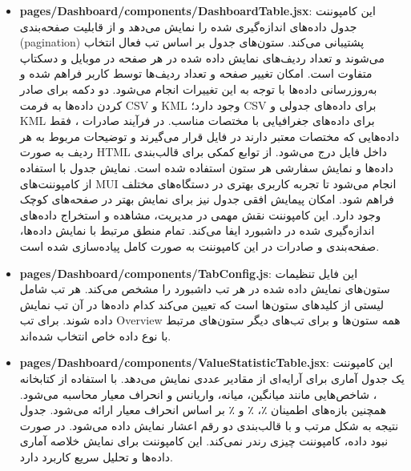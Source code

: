 \begin{itemize}
    	\item \textbf{pages/Dashboard/components/DashboardTable.jsx}:
    	این کامپوننت جدول داده‌های اندازه‌گیری شده را نمایش می‌دهد و از قابلیت صفحه‌بندی (pagination) پشتیبانی می‌کند.
    	ستون‌های جدول بر اساس تب فعال انتخاب می‌شوند و تعداد ردیف‌های نمایش داده شده در هر صفحه در موبایل و دسکتاپ متفاوت است.
    	امکان تغییر صفحه و تعداد ردیف‌ها توسط کاربر فراهم شده و به‌روزرسانی داده‌ها با توجه به این تغییرات انجام می‌شود.
    	دو دکمه برای صادر کردن داده‌ها به فرمت CSV و KML وجود دارد؛ CSV برای داده‌های جدولی و KML برای داده‌های جغرافیایی با مختصات مناسب.
    	در فرآیند صادرات ، فقط داده‌هایی که مختصات معتبر دارند در فایل قرار می‌گیرند و توضیحات مربوط به هر ردیف به صورت HTML داخل فایل درج می‌شود.
    	از توابع کمکی برای قالب‌بندی داده‌ها و نمایش سفارشی هر ستون استفاده شده است.
    	نمایش جدول با استفاده از کامپوننت‌های MUI انجام می‌شود تا تجربه کاربری بهتری در دستگاه‌های مختلف فراهم شود.
    	امکان پیمایش افقی جدول نیز برای نمایش بهتر در صفحه‌های کوچک وجود دارد.
    	این کامپوننت نقش مهمی در مدیریت، مشاهده و استخراج داده‌های اندازه‌گیری شده در داشبورد ایفا می‌کند.
    	تمام منطق مرتبط با نمایش داده‌ها، صفحه‌بندی و صادرات در این کامپوننت به صورت کامل پیاده‌سازی شده است.
    	
    	
    	\item \textbf{pages/Dashboard/components/TabConfig.js}:
    	این فایل تنظیمات ستون‌های نمایش داده شده در هر تب داشبورد را مشخص می‌کند.
    	هر تب شامل لیستی از کلیدهای ستون‌ها است که تعیین می‌کند کدام داده‌ها در آن تب نمایش داده شوند.
    	برای تب Overview همه ستون‌ها و برای تب‌های دیگر ستون‌های مرتبط با نوع داده خاص انتخاب شده‌اند.
    	
    	
    	\item \textbf{pages/Dashboard/components/ValueStatisticTable.jsx}:
    	این کامپوننت یک جدول آماری برای آرایه‌ای از مقادیر عددی نمایش می‌دهد.
    	با استفاده از کتابخانه ، شاخص‌هایی مانند میانگین، میانه، واریانس و انحراف معیار محاسبه می‌شود.
    	همچنین بازه‌های اطمینان ٪، ٪ و ٪ بر اساس انحراف معیار ارائه می‌شود.
    	جدول نتیجه به شکل مرتب و با قالب‌بندی دو رقم اعشار نمایش داده می‌شود.
    	در صورت نبود داده، کامپوننت چیزی رندر نمی‌کند.
    	این کامپوننت برای نمایش خلاصه آماری داده‌ها و تحلیل سریع کاربرد دارد.
    	
    	
    \end{itemize}
    
